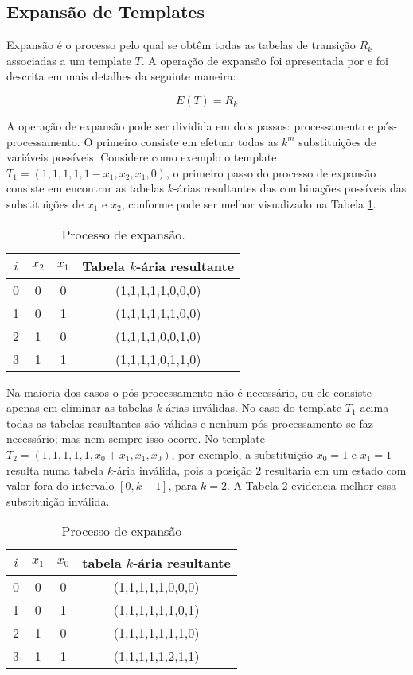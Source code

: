 \newpage\newpage
\subsection{Expansão de Templates}
Expansão é o processo pelo qual se obtêm todas as tabelas de transição $R_k$ associadas a um template $T$.
A operação de expansão foi apresentada por  e foi descrita em mais detalhes da seguinte maneira:

\begin{equation}
E(T)=R_k
\end{equation}

A operação de expansão pode ser dividida em dois passos: processamento e pós-processamento. O primeiro consiste em efetuar todas as $k^m$ substituições de variáveis possíveis. Considere como exemplo o template $T_1 = (1,1,1,1,1-x_1,x_2,x_1,0)$, o primeiro passo do processo de expansão consiste em encontrar as tabelas $k$-árias resultantes das combinações possíveis das substituições de $x_1$ e $x_2$, conforme pode ser melhor visualizado na Tabela \ref{tab:expansionProcess}.
\begin{table}[h!]
\centering
\caption{Processo de expansão.}
	\begin{tabular}{cccc}
    \toprule
	$i$ & $x_2$ & $x_1$ & Tabela $k$-ária resultante \\
    \midrule
	0	&	0	&	0	&	(1,1,1,1,1,0,0,0)	\\
	1	&	0	&	1	&	(1,1,1,1,1,1,0,0)	\\
	2	&	1	&	0	&	(1,1,1,1,0,0,1,0)	\\
	3	&	1	&	1	&	(1,1,1,1,0,1,1,0)	\\
    \bottomrule
	\end{tabular}
\label{tab:expansionProcess}
\end{table}

Na maioria dos casos o pós-processamento não é necessário, ou ele consiste apenas em eliminar as tabelas $k$-árias inválidas. No caso do template $T_1$ acima todas as tabelas resultantes são válidas e nenhum pós-processamento se faz necessário; mas nem sempre isso ocorre. No template $T_2 = (1,1,1,1,1,x_0+x_1,x_1,x_0)$, por exemplo, a substituição $x_0 = 1$ e $x_1 = 1$ resulta numa tabela $k$-ária inválida, pois a posição $2$ resultaria em um estado com valor fora do intervalo $[0,k-1]$, para $k=2$. A Tabela \ref{tab:invalideExpansion} evidencia melhor essa substituição inválida.
\begin{table}[h!]
\centering
\caption{Processo de expansão}
	\begin{tabular}{cccc}
    \toprule
	$i$ & $x_1$ & $x_0$ & tabela $k$-ária resultante \\
    \midrule
	0	&	0	&	0	&	(1,1,1,1,1,0,0,0)	\\
	1	&	0	&	1	&	(1,1,1,1,1,1,0,1)	\\
	2	&	1	&	0	&	(1,1,1,1,1,1,1,0)	\\
	3	&	1	&	1	&	(1,1,1,1,1,2,1,1)	\\
    \bottomrule
   	\end{tabular}
\label{tab:invalideExpansion}
\end{table}

